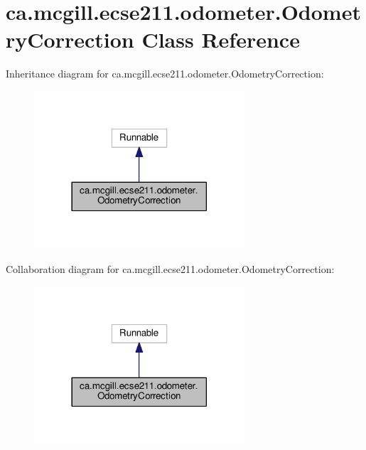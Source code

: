 \hypertarget{classca_1_1mcgill_1_1ecse211_1_1odometer_1_1_odometry_correction}{}\section{ca.\+mcgill.\+ecse211.\+odometer.\+Odometry\+Correction Class Reference}
\label{classca_1_1mcgill_1_1ecse211_1_1odometer_1_1_odometry_correction}


Inheritance diagram for ca.\+mcgill.\+ecse211.\+odometer.\+Odometry\+Correction\+:\nopagebreak
\begin{figure}[H]
\begin{center}
\leavevmode
\includegraphics[width=222pt]{classca_1_1mcgill_1_1ecse211_1_1odometer_1_1_odometry_correction__inherit__graph}
\end{center}
\end{figure}


Collaboration diagram for ca.\+mcgill.\+ecse211.\+odometer.\+Odometry\+Correction\+:\nopagebreak
\begin{figure}[H]
\begin{center}
\leavevmode
\includegraphics[width=222pt]{classca_1_1mcgill_1_1ecse211_1_1odometer_1_1_odometry_correction__coll__graph}
\end{center}
\end{figure}

